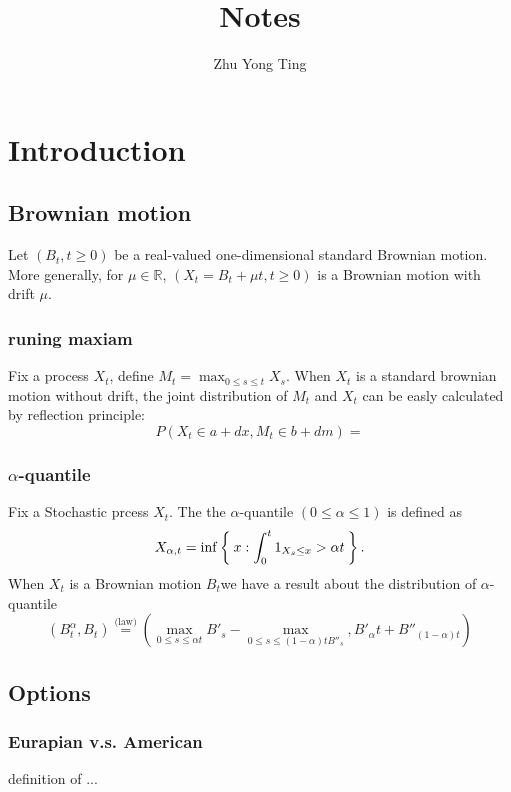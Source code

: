 \documentclass[11pt]{book}
\title{Notes}
\author{Zhu Yong Ting}
\def\bR{{\mathbb{R}}}
\begin{document}
\maketitle
\chapter{Introduction}
\section{Brownian motion}
Let $(B_t, t\geq 0)$  be a real-valued one-dimensional standard Brownian motion.
More generally, 
for $ \mu \in \bR$, $(X_t = B_t + \mu t, t \geq 0)$ 
is a Brownian motion with drift $\mu$. 

\subsection{runing maxiam}
Fix a process $X_t$, define $M_t = \max_{0\leq s\leq t} X_s $. 
When $X_t$ is a standard brownian motion without drift, 
the joint distribution of $M_t$ and $X_t$
 can be easly calculated by reflection principle\cite{Karatzas91}:
\[
P(X_t \in a+dx, M_t \in b+dm) =  
\]

\subsection{$\alpha$-quantile}
Fix a Stochastic prcess $X_t$.
The the $\alpha$-quantile $( 0 \leq \alpha \leq 1)$ 
is defined as 
\[
X_{\alpha,t} = \inf\Set{x:\int_0^t 1_{X_s\leq x} > \alpha t}.
\]
When $X_{t}$ is a Brownian motion $B_t$we have a result about the distribution
of $\alpha$-quantile\cite{Dassios2005}
\[
(B_t^\alpha, B_t) \stackrel{\text{(law)}}{=}
 (\max_{0\leq s\leq \alpha t} B'_s-\max_{0\leq s\leq (1-\alpha)t B''_s},
 B'_\alpha t + B''_{(1-\alpha) t})
\]


\section{Options}

\subsection{Eurapian v.s. American} 
definition of ...
\end{document}
